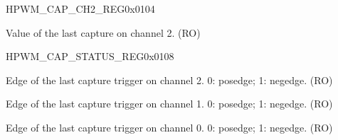 \begin{register}{H}{PWM\_CAP\_CH2\_REG}{0x0104}\label{regdesc:PWMCAPCH2REG}
%
\regnewline%
\begin{regdesc}\begin{reglist}
\item [PWM\_CAP\_CH2\_REG]Value of the last capture on channel 2. (RO)
\end{reglist}\end{regdesc}
\end{register}


\begin{register}{H}{PWM\_CAP\_STATUS\_REG}{0x0108}\label{regdesc:PWMCAPSTATUSREG}
%
%
%
%
\regnewline%
\begin{regdesc}\begin{reglist}
\item [PWM\_CAP2\_EDGE]Edge of the last capture trigger on channel 2. 0: posedge; 1: negedge. (RO)
\item [PWM\_CAP1\_EDGE]Edge of the last capture trigger on channel 1. 0: posedge; 1: negedge. (RO)
\item [PWM\_CAP0\_EDGE]Edge of the last capture trigger on channel 0. 0: posedge; 1: negedge. (RO)
\end{reglist}\end{regdesc}
\end{register}


